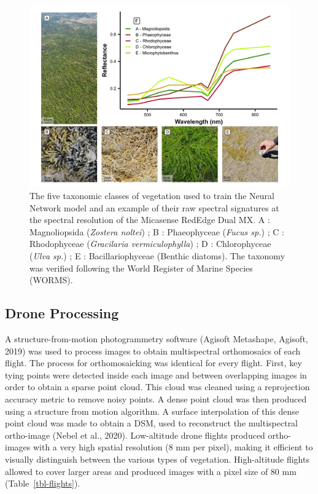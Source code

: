 \documentclass[
  letterpaper,
  11pt,
  english,
  singlespacing,
  headsepline]{MastersDoctoralThesis}
\begin{document}
\begin{spacing}{1.5}
\begin{figure}
{\includegraphics[width=0.95\linewidth,height=\textheight,keepaspectratio]{Chapter3/Figs/Figure2.png}

}

\caption{\label{fig-vegetation}The five taxonomic classes of vegetation
used to train the Neural Network model and an example of their raw
spectral signatures at the spectral resolution of the Micasense RedEdge
Dual MX. A : Magnoliopsida (\emph{Zostera noltei}) ; B : Phaeophyceae
(\emph{Fucus sp.}) ; C : Rhodophyceae (\emph{Gracilaria
vermiculophylla}) ; D : Chlorophyceae (\emph{Ulva sp.}) ; E :
Bacillariophyceae (Benthic diatoms). The taxonomy was verified following
the World Register of Marine Species (WORMS).}

\end{figure}%

\subsection{Drone Processing}\label{drone-processing}

A structure-from-motion photogrammetry software (Agisoft Metashape,
Agisoft, 2019) was used to process images to obtain multispectral
orthomosaics of each flight. The process for orthomosaicking was
identical for every flight. First, key tying points were detected inside
each image and between overlapping images in order to obtain a sparse
point cloud. This cloud was cleaned using a reprojection accuracy metric
to remove noisy points. A dense point cloud was then produced using a
structure from motion algorithm. A surface interpolation of this dense
point cloud was made to obtain a DSM, used to reconstruct the
multispectral ortho-image (Nebel et al., 2020). Low-altitude drone
flights produced ortho-images with a very high spatial resolution (8 mm
per pixel), making it efficient to visually distinguish between the
various types of vegetation. High-altitude flights allowed to cover
larger areas and produced images with a pixel size of 80 mm
(Table~\ref{tbl-flights}).


\end{spacing}
\end{document}
